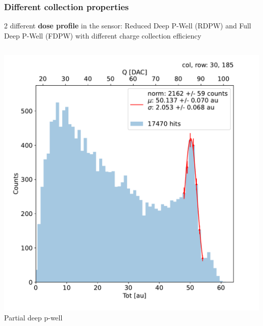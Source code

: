 \begin{frame}[noframenumbering]
    \end{frame}   

    \begin{frame}[noframenumbering]
        \frametitle{Different collection properties}
        2 different \textbf{dose profile} in the sensor: Reduced Deep P-Well (RDPW) and Full Deep P-Well (FDPW) with different charge collection efficiency
        \begin{columns}
                \includegraphics[width=1.\linewidth]{figures/charaterization/fit_gauss_r185.pdf}
                \centering Partial deep p-well

\end{columns}
\end{frame}
